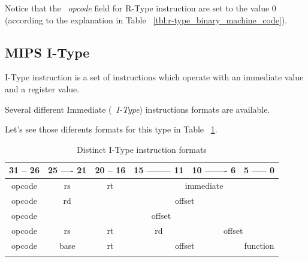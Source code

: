 \documentclass[
  oneside,
  11pt, a4paper,
  footinclude=true,
  headinclude=true,
  cleardoublepage=empty
]{scrbook}
\begin{document}
Notice that the ~\textit{opcode} field for R-Type instruction are set to the value 0 (according to the explanation in Table ~\ref{tbl:r-type_binary_machine_code}).


\subsection{MIPS I-Type}

I-Type instruction is a set of instructions which operate with an immediate value and a register value. 

Several different Immediate (~\textit{I-Type}) instructions formats are available.

Let's see those diferents formats for this type in Table ~\ref{tbl:I-Type_instruction_format}.

\begin{table}[h!]
\centering
\begin{tabular}{ccccll}
\multicolumn{1}{l|}{31 -- 26} & \multicolumn{1}{l|}{25 ---- 21} & \multicolumn{1}{l|}{20 -- 16} & \multicolumn{1}{l|}{15 -------- 11} & \multicolumn{1}{l|}{10 ------- 6} & 5 ----- 0                     \\ \hline
\multicolumn{1}{|c|}{opcode}  & \multicolumn{1}{c|}{rs}         & \multicolumn{1}{c|}{rt}       & \multicolumn{3}{c|}{immediate}                                                                          \\ \hline
\multicolumn{1}{|c|}{opcode}  & \multicolumn{1}{c|}{rd}         & \multicolumn{4}{c|}{offset}                                                                                                             \\ \hline
\multicolumn{1}{|c|}{opcode}  & \multicolumn{5}{c|}{offset}                                                                                                                                               \\ \hline
\multicolumn{1}{|c|}{opcode}  & \multicolumn{1}{c|}{rs}         & \multicolumn{1}{c|}{rt}       & \multicolumn{1}{c|}{rd}             & \multicolumn{2}{c|}{offset}                                       \\ \hline
\multicolumn{1}{|c|}{opcode}  & \multicolumn{1}{c|}{base}       & \multicolumn{1}{c|}{rt}       & \multicolumn{2}{c|}{offset}                                             & \multicolumn{1}{c|}{function} \\ \hline
\multicolumn{1}{l}{}          & \multicolumn{1}{l}{}            & \multicolumn{1}{l}{}          & \multicolumn{1}{l}{}                &                                   &                              
\end{tabular}
\caption{Distinct I-Type instruction formats}
\label{tbl:I-Type_instruction_format}
\end{table}
\end{document}
